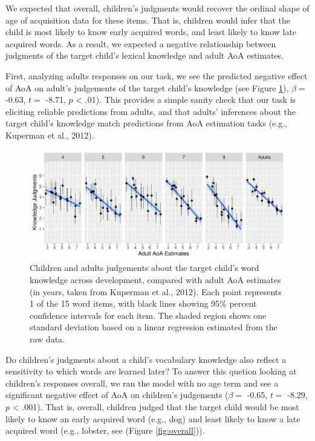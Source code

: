\documentclass[10pt, letterpaper]{article}
\newenvironment{CodeChunk}{}{}
\begin{document}
We expected that overall, children's judgments would recover the ordinal
shape of age of acquisition data for these items. That is, children
would infer that the child is most likely to know early acquired words,
and least likely to know late acquired words. As a result, we expected a
negative relationship between judgments of the target child's lexical
knowledge and adult AoA estimates.

First, analyzing adults responses on our task, we see the predicted
negative effect of AoA on adult's judgements of the target child's
knowledge (see Figure \ref{fig:development}), \(\beta =\) -0.63, \(t =\)
-8.71, \(p\) \textless{} .01). This provides a simple sanity check that
our task is eliciting reliable predictions from adults, and that adults'
inferences about the target child's knowledge match predictions from AoA
estimation tasks (e.g., Kuperman et al., 2012).

\begin{CodeChunk}
\begin{figure}[tb]
\includegraphics{figs/development-1} \caption[Children and adults judgements about the target child's word knowledge across development, compared with adult AoA estimates (in years, taken from Kuperman et al., 2012)]{Children and adults judgements about the target child's word knowledge across development, compared with adult AoA estimates (in years, taken from Kuperman et al., 2012). Each point represents 1 of the 15 word items, with black lines showing 95\% percent confidence intervals for each item. The shaded region shows one standard deviation based on a linear regression estimated from the raw data.}\label{fig:development}
\end{figure}
\end{CodeChunk}

Do children's judgments about a child's vocabulary knowledge also
reflect a sensitivity to which words are learned later? To answer this
quetion looking at children's responses overall, we ran the model with
no age term and see a significant negative effect of AoA on children's
judgements (\(\beta =\) -0.65, \(t =\) -8.29, \(p\) \textless{} .001).
That is, overall, children judged that the target child would be most
likely to know an early acquired word (e.g., dog) and least likely to
know a late acquired word (e.g., lobster, see (Figure
\ref{fig:overall})).
\end{document}
